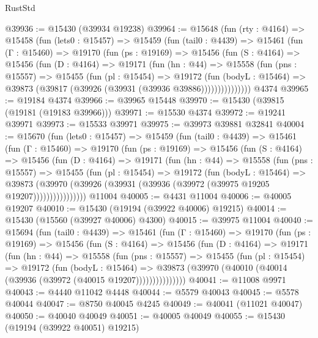 \begin{lexlean}{RustStd}
\begin{coremodule}
@39936 := @15430 (@39934 @19238)
@39964 := @15648
    (fun (rty : @4164) =>
    @15458
      (fun (lets0 : @15457) =>
      @15459
        (fun (tail0 : @4439) =>
        @15461
          (fun (Γ : @15460) =>
          @19170
            (fun (ps : @19169) =>
            @15456
              (fun (S : @4164) =>
              @15456
                (fun (D : @4164) =>
                @19171
                  (fun (hn : @44) =>
                  @15558
                    (fun (pns : @15557) =>
                    @15455
                      (fun (pl : @15454) =>
                      @19172
                        (fun (bodyL : @15464) =>
                        @39873 (@39817 (@39926 (@39931 (@39936 @39886)))))))))))))))
    @4374
@39965 := @19184 @4374
@39966 := @39965 @15448
@39970 := @15430 (@39815 (@19181 (@19183 @39966)))
@39971 := @15530 @4374
@39972 := @19241 @39971
@39973 := @15533 @39971
@39975 := @39973 @39881 @32841
@40004 := @15670
    (fun (lets0 : @15457) =>
    @15459
      (fun (tail0 : @4439) =>
      @15461
        (fun (Γ : @15460) =>
        @19170
          (fun (ps : @19169) =>
          @15456
            (fun (S : @4164) =>
            @15456
              (fun (D : @4164) =>
              @19171
                (fun (hn : @44) =>
                @15558
                  (fun (pns : @15557) =>
                  @15455
                    (fun (pl : @15454) =>
                    @19172
                      (fun (bodyL : @15464) =>
                      @39873
                        (@39970
                          (@39926 (@39931 (@39936 (@39972 (@39975 @19205 @19207))))))))))))))))
    @11004
@40005 := @4431 @11004
@40006 := @40005 @19207
@40010 := @15430 (@19194 (@39922 @40006) @19215)
@40014 := @15430 (@15560 (@39927 @40006) @4300)
@40015 := @39975 @11004
@40040 := @15694
    (fun (tail0 : @4439) =>
    @15461
      (fun (Γ : @15460) =>
      @19170
        (fun (ps : @19169) =>
        @15456
          (fun (S : @4164) =>
          @15456
            (fun (D : @4164) =>
            @19171
              (fun (hn : @44) =>
              @15558
                (fun (pns : @15557) =>
                @15455
                  (fun (pl : @15454) =>
                  @19172
                    (fun (bodyL : @15464) =>
                    @39873 (@39970 (@40010 (@40014 (@39936 (@39972 (@40015 @19207)))))))))))))))
@40041 := @11008 @9971
@40043 := @4440 @11042 @4448
@40044 := @5579 @40043
@40045 := @5578 @40044
@40047 := @8750 @40045 @4245
@40049 := @40041 (@11021 @40047)
@40050 := @40040 @40049
@40051 := @40005 @40049
@40055 := @15430 (@19194 (@39922 @40051) @19215)

\end{coremodule}
\end{lexlean}
